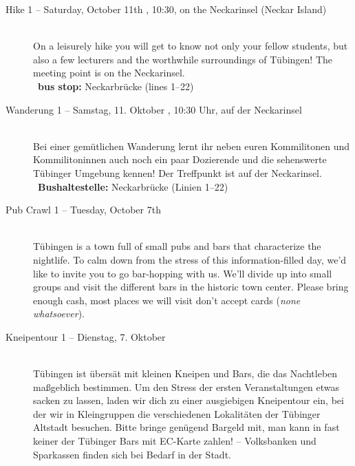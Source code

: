 \begin{description}

\ifml
\item[Hike 1 -- Saturday, October 11th \YEAR, 10:30, on the Neckarinsel (Neckar Island)]~\\
On a leisurely hike you will get to know not only your fellow students,
but also a few lecturers and the worthwhile surroundings of Tübingen!
The meeting point is on the Neckarinsel.\\
~\textbf{bus stop:} Neckarbrücke (lines 1--22)
\else
\item[Wanderung 1 -- Samstag, 11. Oktober \YEAR, 10:30 Uhr, auf der Neckarinsel]~\\
Bei einer gemütlichen Wanderung lernt ihr neben euren Kommilitonen und Kommilitoninnen auch
noch ein paar Dozierende und die sehenswerte Tübinger Umgebung kennen!
Der Treffpunkt ist auf der Neckarinsel.\\
~\textbf{Bushaltestelle:} Neckarbrücke (Linien 1--22)
\fi

\ifmaster \ifinfo \iflehramt \else \pagebreak \fi \fi \fi
\ifmaster \ifmedien \pagebreak \fi \fi
\ifmaster \ifmedinfo \pagebreak \fi \fi
\ifmaster \ifkogwiss \pagebreak \fi \fi

\ifml
    \item[Pub Crawl 1 -- Tuesday, October 7th \YEAR]~\\
    Tübingen is a town full of small pubs and bars that characterize the nightlife.
    To calm down from the stress of this information-filled day, we'd like to invite you to go bar-hopping with us.
    We'll divide up into small groups and visit the different bars in the historic town center.
    Please bring enough cash, most places we will visit don't accept cards (\emph{none whatsoever}).
\else
    \item[Kneipentour 1 -- Dienstag, 7. Oktober \YEAR]~\\
    Tübingen ist übersät mit kleinen Kneipen und Bars, die das Nachtleben maßgeblich bestimmen.
    Um den Stress der ersten Veranstaltungen etwas sacken zu lassen, laden wir dich zu einer ausgiebigen Kneipentour ein,
    bei der wir in Kleingruppen die verschiedenen Lokalitäten der Tübinger Altstadt besuchen.
    Bitte bringe genügend Bargeld mit, man kann in fast keiner der Tübinger Bars mit EC-Karte zahlen! -- Volksbanken und Sparkassen finden sich bei Bedarf in der Stadt.
\fi


\end{description}
